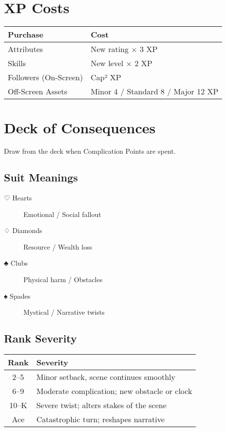 \section{XP Costs}

\begin{center}
\begin{tabular}{ll}
\toprule
\textbf{Purchase} & \textbf{Cost} \\
\midrule
Attributes & New rating × 3 XP \\
Skills & New level × 2 XP \\
Followers (On-Screen) & Cap² XP \\
Off-Screen Assets & Minor 4 / Standard 8 / Major 12 XP \\
\bottomrule
\end{tabular}
\end{center}

\section{Deck of Consequences}

Draw from the deck when Complication Points are spent.

\subsection*{Suit Meanings}
\begin{description}
  \item[♡ Hearts] Emotional / Social fallout
  \item[♢ Diamonds] Resource / Wealth loss
  \item[♣ Clubs] Physical harm / Obstacles
  \item[♠ Spades] Mystical / Narrative twists
\end{description}

\subsection*{Rank Severity}
\begin{center}
\begin{tabular}{cl}
\toprule
\textbf{Rank} & \textbf{Severity} \\
\midrule
2–5 & Minor setback, scene continues smoothly \\
6–9 & Moderate complication; new obstacle or clock \\
10–K & Severe twist; alters stakes of the scene \\
Ace & Catastrophic turn; reshapes narrative \\
\bottomrule
\end{tabular}
\end{center}

